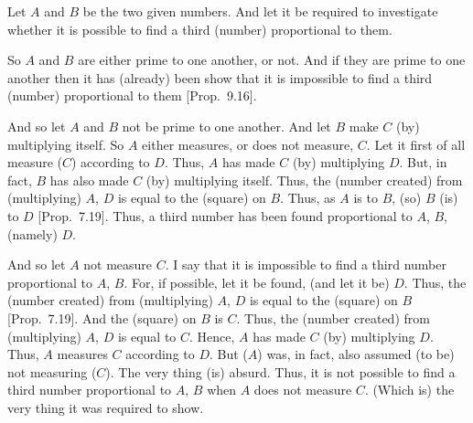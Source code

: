 \begin{Parallel}{}{}
{\epsfysize=0.4in
\centerline{}

Let $A$ and $B$ be the two given numbers. And let it be required to investigate whether it is possible to find a third (number) proportional
to them.

So $A$ and $B$ are either prime to one another, or not. 
And if they are prime to one another then it has (already) been show that it is impossible
to find a third (number) proportional to them [Prop.~9.16].

And so let $A$ and $B$ not be prime to one another. And let $B$ make $C$
(by) multiplying itself. So $A$ either measures, or does not measure, $C$. 
Let it first of all measure ($C$) according to $D$. Thus, $A$ has made
$C$ (by) multiplying $D$. But, in fact, $B$ has also made
$C$ (by) multiplying itself. Thus, the (number created) from (multiplying)
$A$, $D$ is equal to the (square) on $B$. Thus, as $A$ is to $B$, (so)
$B$ (is) to $D$ [Prop.~7.19]. Thus, a third number
has been found proportional to $A$, $B$, (namely) $D$. 

And so let $A$ not measure $C$. I say that it is impossible to find a third
number proportional to $A$, $B$. For, if possible, let it be found,
(and let it be) $D$. Thus, the (number created) from (multiplying) $A$, $D$
is equal to the (square) on $B$ [Prop.~7.19]. 
And the (square) on $B$ is $C$. Thus, the (number created) from (multiplying) $A$, $D$
is equal to $C$. Hence, $A$ has made $C$ (by) multiplying $D$. 
Thus, $A$ measures $C$ according to $D$. But ($A$) was, in fact, also assumed
(to be) not measuring ($C$). The very thing (is) absurd. Thus, it is not
possible to find a third number proportional to $A$, $B$ when $A$ does not
measure $C$. (Which is) the very thing it was required to show.}
\end{Parallel}

